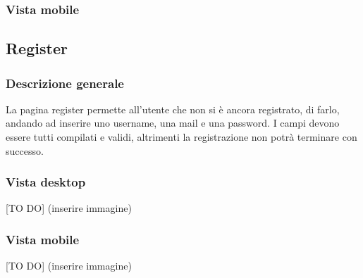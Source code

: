 		\subsubsection{Vista mobile} %

	\subsection{Register} %
	\label{sub:register}
		\subsubsection{Descrizione generale} %
		La pagina register permette all'utente che non si è ancora registrato, di farlo, andando ad inserire uno username, una mail e una password. I campi devono essere tutti compilati e validi, altrimenti la registrazione non potrà terminare con successo.

		\subsubsection{Vista desktop} %
		[TO DO] (inserire immagine)

		\subsubsection{Vista mobile} %
		[TO DO] (inserire immagine)

